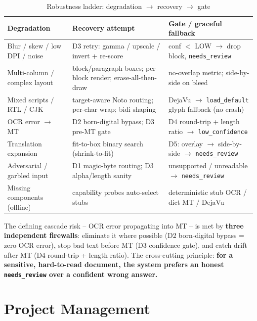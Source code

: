 \documentclass[12pt,a4paper]{article}
\begin{document}
\begin{table}[H]
\centering
\caption{Robustness ladder: degradation $\rightarrow$ recovery $\rightarrow$ gate}
\small
\begin{tabularx}{\linewidth}{@{} L L L @{}}
\toprule
\textbf{Degradation} & \textbf{Recovery attempt} & \textbf{Gate / graceful fallback} \\
\midrule
Blur / skew / low DPI / noise & D3 retry: gamma / upscale / invert + re-score & conf $<$ LOW $\rightarrow$ drop block, \texttt{needs\_review} \\
Multi-column / complex layout & block/paragraph boxes; per-block render; erase-all-then-draw & no-overlap metric; side-by-side on bleed \\
Mixed scripts / RTL / CJK & target-aware Noto routing; per-char wrap; bidi shaping & DejaVu $\rightarrow$ \texttt{load\_default} glyph fallback (no crash) \\
OCR error $\rightarrow$ MT & D2 born-digital bypass; D3 pre-MT gate & D4 round-trip + length ratio $\rightarrow$ \texttt{low\_confidence} \\
Translation expansion & fit-to-box binary search (shrink-to-fit) & D5: overlay $\rightarrow$ side-by-side $\rightarrow$ \texttt{needs\_review} \\
Adversarial / garbled input & D1 magic-byte routing; D3 alpha/length sanity & unsupported / unreadable $\rightarrow$ \texttt{needs\_review} \\
Missing components (offline) & capability probes auto-select stubs & deterministic stub OCR / dict MT / DejaVu \\
\bottomrule
\end{tabularx}
\end{table}

The defining cascade risk -- OCR error propagating into MT -- is met by \textbf{three independent firewalls}: eliminate it where possible (D2 born-digital bypass = zero OCR error), stop bad text before MT (D3 confidence gate), and catch drift after MT (D4 round-trip + length ratio). The cross-cutting principle: \textbf{for a sensitive, hard-to-read document, the system prefers an honest \texttt{needs\_review} over a confident wrong answer.}

\section{Project Management}
\end{document}
